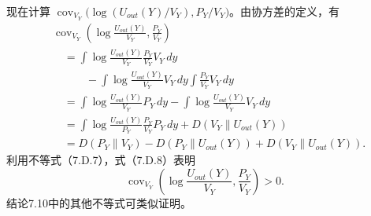 现在计算 $\operatorname{cov}_{V_Y}\bigl(\log(U_{out}(Y)/V_Y),P_Y/V_Y\bigr)$。由协方差的定义，有
\begin{equation}
\begin{aligned}
&\operatorname{cov}_{V_Y}\left(\log\frac{U_{out}(Y)}{V_Y},\frac{P_Y}{V_Y}\right)\\
&\quad=\int\log\frac{U_{out}(Y)}{V_Y}\frac{P_Y}{V_Y}V_Y\,dy\\
&\qquad\quad{}-\int\log\frac{U_{out}(Y)}{V_Y}V_Y\,dy
 \int\frac{P_Y}{V_Y}V_Y\,dy\\
&\quad=\int\log\frac{U_{out}(Y)}{V_Y}P_Y\,dy
 -\int\log\frac{U_{out}(Y)}{V_Y}V_Y\,dy\\
&\quad=\int\log\frac{U_{out}(Y)}{P_Y}\frac{P_Y}{V_Y}P_Y\,dy
 +D(V_Y\parallel U_{out}(Y))\\
&\quad=D(P_Y\parallel V_Y)-D(P_Y\parallel U_{out}(Y))
 +D(V_Y\parallel U_{out}(Y)).
\end{aligned}\tag{7.D.8}
\end{equation}
利用不等式（7.D.7），式（7.D.8）表明
\[
\operatorname{cov}_{V_Y}\left(\log\frac{U_{out}(Y)}{V_Y},\frac{P_Y}{V_Y}\right)>0.
\]
结论7.10中的其他不等式可类似证明。
